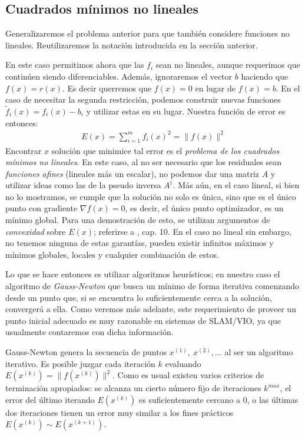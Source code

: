 \documentclass[ twoside,openright,titlepage,numbers=noenddot,%
                headinclude,footinclude,cleardoublepage=empty,abstract=on,
                BCOR=-5mm,paper=a4,fontsize=11pt
                ]{scrreprt}
\begin{document}
\hypertarget{cuadrados-muxednimos-no-lineales}{%
\subsection{Cuadrados mínimos no
lineales}\label{cuadrados-muxednimos-no-lineales}}

Generalizaremos el problema anterior para que también considere
funciones no lineales. Reutilizaremos la notación introducida en la
sección anterior.

En este caso permitimos ahora que las \(f_i\) sean no lineales, aunque
requerimos que continúen siendo diferenciables. Además, ignoraremos el
vector \(b\) haciendo que \(f(x) = r(x)\). Es decir querremos que
\(f(x) = 0\) en lugar de \(f(x) = b\). En el caso de necesitar la
segunda restricción, podemos construir nuevas funciones
\(\tilde{f}_i(x) = f_i(x) - b_i\) y utilizar estas en su lugar. Nuestra
función de error es entonces: \begin{align}
E(x) = \sum_{i=1}^m{f_i(x)^2} = \| f(x) \| ^ 2
\end{align} Encontrar \(x\) solución que minimice tal error es el
\emph{problema de los cuadrados mínimos no lineales}. En este caso, al
no ser necesario que los residuales sean \emph{funciones afines}
(lineales más un escalar), no podemos dar una matriz \(A\) y utilizar
ideas como las de la pseudo inversa \(A^{\dagger}\). Más aún, en el caso
lineal, si bien no lo mostramos, se cumple que la solución no solo es
única, sino que es el único punto con gradiente \(\nabla f(x) = 0\), es
decir, el único punto optimizador, es un mínimo global. Para una
demostración de esto, se utilizan argumentos de \emph{convexidad} sobre
\(E(x)\); referirse a \textcite{nocedalNumericalOptimization2006}, cap.
10. En el caso no lineal sin embargo, no tenemos ninguna de estas
garantías, pueden existir infinitos máximos y mínimos globales, locales
y cualquier combinación de estos.

Lo que se hace entonces es utilizar algoritmos heurísticos; en nuestro
caso el algoritmo de \emph{Gauss-Newton} que busca un mínimo de forma
iterativa comenzando desde un punto que, si se encuentra lo
suficientemente cerca a la solución, convergerá a ella. Como veremos más
adelante, este requerimiento de proveer un punto inicial adecuado es muy
razonable en sistemas de SLAM/VIO, ya que usualmente contaremos con
dicha información.

Gauss-Newton genera la secuencia de puntos \(x^{(1)},\ x^{(2)}, ...\) al
ser un algoritmo iterativo. Es posible juzgar cada iteración \(k\)
evaluando \(E(x^{(k)}) = \| f(x^{(k)})\|^2\). Como es usual existen
varios criterios de terminación apropiados: se alcanza un cierto número
fijo de iteraciones \(k^{max}\), el error del último iterando
\(E(x^{(k)})\) es suficientemente cercano a \(0\), o las últimas dos
iteraciones tienen un error muy similar a los fines prácticos
\(E(x^{(k)}) \sim E(x^{(k + 1)})\).
\end{document}
